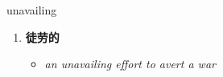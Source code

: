 
\begin{frame}
{\huge unavailing}
\begin{center}
\begin{enumerate}\Large
  \item \textbf{徒劳的}
  \begin{itemize}
    \item \em{\Large{an unavailing effort to avert a war}}
  \end{itemize}
\end{enumerate}
\end{center}
\end{frame}
